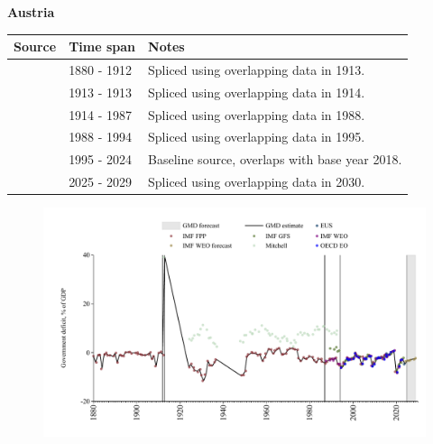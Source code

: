 \documentclass[12pt,a4paper,landscape]{article}
\begin{document}
\begin{adjustbox}{max totalsize={\paperwidth}{\paperheight},center}
\begin{minipage}[t][\textheight][t]{\textwidth}
\vspace*{0.5cm}
{}
\begin{center}
{\Large\bfseries Austria}
\end{center}
\vspace{0.5cm}
\begin{table}[H]
\centering
\small
\begin{tabular}{|l|l|l|}
\hline
\textbf{Source} & \textbf{Time span} & \textbf{Notes} \\
\hline
\rowcolor{white}\cite{IMF_FPP}& 1880 - 1912 &Spliced using overlapping data in 1913.\\
\rowcolor{lightgray}\cite{Mitchell}& 1913 - 1913 &Spliced using overlapping data in 1914.\\
\rowcolor{white}\cite{IMF_FPP}& 1914 - 1987 &Spliced using overlapping data in 1988.\\
\rowcolor{lightgray}\cite{IMF_WEO}& 1988 - 1994 &Spliced using overlapping data in 1995.\\
\rowcolor{white}\cite{EUS}& 1995 - 2024 &Baseline source, overlaps with base year 2018.\\
\rowcolor{lightgray}\cite{IMF_WEO_forecast}& 2025 - 2029 &Spliced using overlapping data in 2030.\\
\hline
\end{tabular}
\end{table}
\begin{figure}[H]
\centering
\includegraphics[width=\textwidth,height=0.6\textheight,keepaspectratio]{graphs/AUT_govdef_GDP.pdf}
\end{figure}
\end{minipage}
\end{adjustbox}
\end{document}
